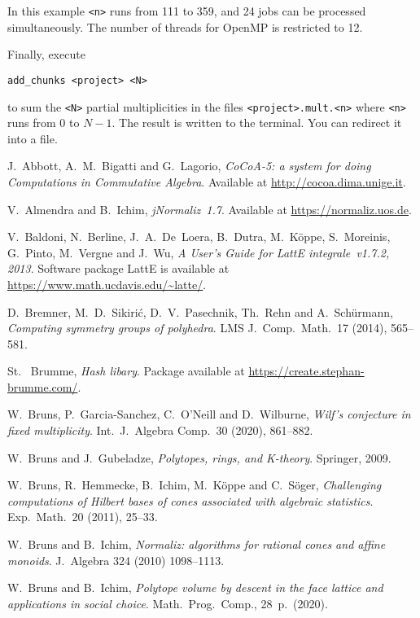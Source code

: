 \documentclass[12pt,a4paper]{scrartcl}
\theoremstyle{definition}
\begin{document}
In this example \verb|<n>| runs from 111 to 359, and 24 jobs can be processed simultaneously. The number of threads for OpenMP is restricted to 12.

Finally, execute 
\begin{Verbatim}
add_chunks <project> <N>
\end{Verbatim}
to sum the \verb|<N>| partial multiplicities in the files \verb|<project>.mult.<n>| where \verb|<n>| runs from $0$ to $N-1$. The result is written to the terminal. You can redirect it into a file.


\newpage

\begin{thebibliography}{15.}
\small

J.~Abbott, A.~M.~Bigatti and G.~Lagorio,
\emph{CoCoA-5: a system for doing Computations in Commutative Algebra}.
Available at \url{http://cocoa.dima.unige.it}.

V.~Almendra and B.~Ichim,
\emph{jNormaliz~1.7}.
Available at \url{https://normaliz.uos.de}.

V.~Baldoni, N.~Berline, J.~A.~De~Loera, B.~Dutra,
M.~K\"oppe, S.~Moreinis, G.~Pinto, M.~Vergne and J.~Wu,
\emph{A User's Guide for LattE integrale~v1.7.2, 2013}.
Software package LattE is available at \url{https://www.math.ucdavis.edu/~latte/}.

D.~Bremner, M.~D.~Sikiri\'c, D.~V.~Pasechnik, Th.~Rehn and A.~Sch\"urmann,
\emph{Computing symmetry groups of polyhedra}.
LMS J.\ Comp.\ Math.\ 17 (2014), 565--581.

St.~ Brumme,
\emph{Hash libary}.
Package available at \url{https://create.stephan-brumme.com/}.

W.~Bruns, P.~Garcia-Sanchez, C.~O'Neill and D.~Wilburne,
\emph{Wilf's conjecture in fixed multiplicity}.
Int.\ J.\ Algebra Comp.\ 30 (2020), 861--882.

W.~Bruns and J.~Gubeladze,
\emph{Polytopes, rings, and K-theory}.
Springer, 2009.

W.~Bruns, R.~Hemmecke, B.~Ichim, M.~K\"oppe and C.~S\"oger,
\emph{Challenging computations of Hilbert bases of cones associated with algebraic statistics}.
Exp.\ Math.\ 20 (2011), 25--33.

W.~Bruns and B.~Ichim,
\emph{Normaliz: algorithms for rational cones and affine monoids}.
J.\ Algebra 324 (2010) 1098--1113.

W.~Bruns and B.~Ichim,
\emph{Polytope volume by descent in the face lattice and applications in social choice}.
Math.\ Prog.\ Comp., 28~p.\ (2020).


\end{thebibliography}
\end{document}
